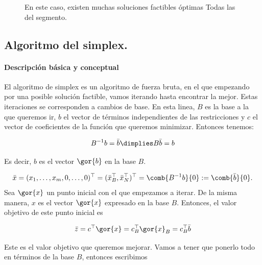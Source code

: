 \begin{figure}[h!]
\centering
{}
\caption{En este caso, existen muchas soluciones factibles óptimas Todas las del segmento.}
\end{figure}



\begin{theorem}

\end{theorem}

\subsection{Algoritmo del simplex.}

\paragraph{Descripción básica y conceptual}
El algoritmo de simplex es un algoritmo de fuerza bruta, en el que empezando por una posible solución factible, vamos iterando hasta encontrar la mejor. Estas iteraciones se corresponden a cambios de base. En esta linea, $B$ es la base a la que queremos ir, $b$ el vector de términos independientes de las restricciones y $c$ el vector de coeficientes de la función que queremos minimizar. Entonces tenemos:

\[B^{-1}b = \bar{b} \dimplies B\bar{b} = b\]

Es decir, $b$ es el vector $\gor{b}$ en la base $B$.

\[\bar{x}=(x_1,\ldots,x_m,0,\ldots,0)^\top=(\bar{x}_B^\top,\bar{x}_N^\top)^\top=
\comb{B^{-1}b}{0}:=
\comb{\bar{b}}{0}.\]
Sea $\gor{x}$ un punto inicial con el que empezamos a iterar. De la misma manera, $x$ es el vector $\gor{x}$ expresado en la base $B$. 
Entonces, el valor objetivo de este punto inicial es 

\[\bar{z} = c^\top\gor{x} = c^\top_B\gor{x}_B = c^\top_B\bar{b}\] 

Este es el valor objetivo que queremos mejorar. Vamos a tener que ponerlo todo en términos de la base $B$, entonces escribimos

